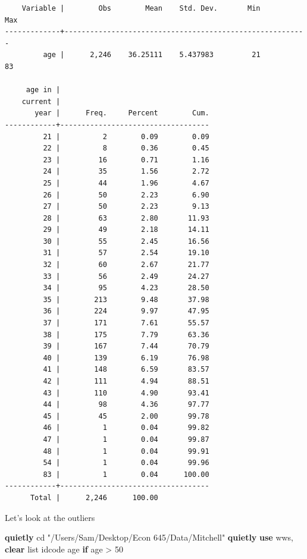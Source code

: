 \documentclass[
]{book}
\newenvironment{Shaded}{\begin{snugshade}}{\end{snugshade}}
\newcommand{\KeywordTok}[1]{\textcolor[rgb]{0.13,0.29,0.53}{\textbf{#1}}}
\newcommand{\NormalTok}[1]{#1}
\newcommand{\OtherTok}[1]{\textcolor[rgb]{0.56,0.35,0.01}{#1}}
\newcommand{\StringTok}[1]{\textcolor[rgb]{0.31,0.60,0.02}{#1}}
\begin{document}
\begin{verbatim}
    Variable |        Obs        Mean    Std. Dev.       Min        Max
-------------+---------------------------------------------------------
         age |      2,246    36.25111    5.437983         21         83

     age in |
    current |
       year |      Freq.     Percent        Cum.
------------+-----------------------------------
         21 |          2        0.09        0.09
         22 |          8        0.36        0.45
         23 |         16        0.71        1.16
         24 |         35        1.56        2.72
         25 |         44        1.96        4.67
         26 |         50        2.23        6.90
         27 |         50        2.23        9.13
         28 |         63        2.80       11.93
         29 |         49        2.18       14.11
         30 |         55        2.45       16.56
         31 |         57        2.54       19.10
         32 |         60        2.67       21.77
         33 |         56        2.49       24.27
         34 |         95        4.23       28.50
         35 |        213        9.48       37.98
         36 |        224        9.97       47.95
         37 |        171        7.61       55.57
         38 |        175        7.79       63.36
         39 |        167        7.44       70.79
         40 |        139        6.19       76.98
         41 |        148        6.59       83.57
         42 |        111        4.94       88.51
         43 |        110        4.90       93.41
         44 |         98        4.36       97.77
         45 |         45        2.00       99.78
         46 |          1        0.04       99.82
         47 |          1        0.04       99.87
         48 |          1        0.04       99.91
         54 |          1        0.04       99.96
         83 |          1        0.04      100.00
------------+-----------------------------------
      Total |      2,246      100.00
\end{verbatim}

Let's look at the outliers

\begin{Shaded}
\begin{Highlighting}[]
\KeywordTok{quietly}\NormalTok{ cd }\StringTok{"/Users/Sam/Desktop/Econ 645/Data/Mitchell"}
\KeywordTok{quietly} \KeywordTok{use}\NormalTok{ wws, }\KeywordTok{clear}
\OtherTok{list}\NormalTok{ idcode age }\KeywordTok{if}\NormalTok{ age \textgreater{} 50}
\end{Highlighting}
\end{Shaded}
\end{document}
